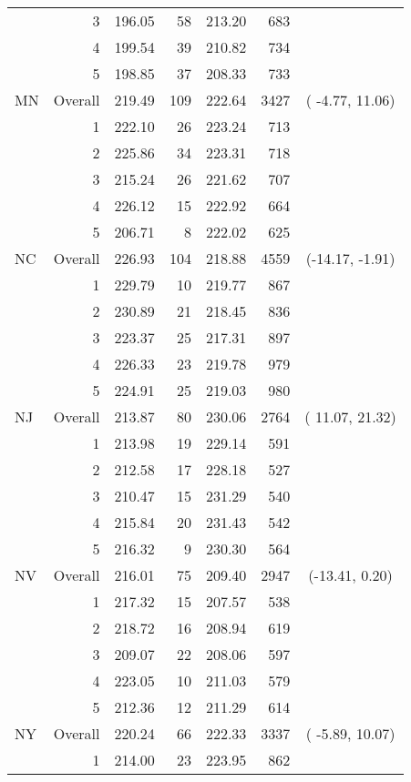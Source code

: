 \begin{longtable}{lrrr@{\extracolsep{.25cm}}rrc}
   & 3 & 196.05 &  58 & 213.20 & 683 &  \\ 
   & 4 & 199.54 &  39 & 210.82 & 734 &  \\ 
   & 5 & 198.85 &  37 & 208.33 & 733 &  \\ 
   \hline
MN & Overall & 219.49 & 109 & 222.64 & 3427 & ( -4.77,  11.06) \\ 
   & 1 & 222.10 &  26 & 223.24 & 713 &  \\ 
   & 2 & 225.86 &  34 & 223.31 & 718 &  \\ 
   & 3 & 215.24 &  26 & 221.62 & 707 &  \\ 
   & 4 & 226.12 &  15 & 222.92 & 664 &  \\ 
   & 5 & 206.71 &   8 & 222.02 & 625 &  \\ 
   \hline
NC & Overall & 226.93 & 104 & 218.88 & 4559 & (-14.17,  -1.91) \\ 
   & 1 & 229.79 &  10 & 219.77 & 867 &  \\ 
   & 2 & 230.89 &  21 & 218.45 & 836 &  \\ 
   & 3 & 223.37 &  25 & 217.31 & 897 &  \\ 
   & 4 & 226.33 &  23 & 219.78 & 979 &  \\ 
   & 5 & 224.91 &  25 & 219.03 & 980 &  \\ 
   \hline
NJ & Overall & 213.87 &  80 & 230.06 & 2764 & ( 11.07,  21.32) \\ 
   & 1 & 213.98 &  19 & 229.14 & 591 &  \\ 
   & 2 & 212.58 &  17 & 228.18 & 527 &  \\ 
   & 3 & 210.47 &  15 & 231.29 & 540 &  \\ 
   & 4 & 215.84 &  20 & 231.43 & 542 &  \\ 
   & 5 & 216.32 &   9 & 230.30 & 564 &  \\ 
   \hline
NV & Overall & 216.01 &  75 & 209.40 & 2947 & (-13.41,   0.20) \\ 
   & 1 & 217.32 &  15 & 207.57 & 538 &  \\ 
   & 2 & 218.72 &  16 & 208.94 & 619 &  \\ 
   & 3 & 209.07 &  22 & 208.06 & 597 &  \\ 
   & 4 & 223.05 &  10 & 211.03 & 579 &  \\ 
   & 5 & 212.36 &  12 & 211.29 & 614 &  \\ 
   \hline
NY & Overall & 220.24 &  66 & 222.33 & 3337 & ( -5.89,  10.07) \\ 
   & 1 & 214.00 &  23 & 223.95 & 862 &  \\ 

\end{longtable}
